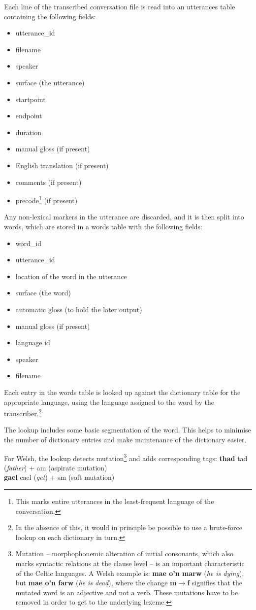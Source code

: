 \documentclass[11pt]{article}
\begin{document}
Each line of the transcribed conversation file is read into an utterances table containing the following fields:
\begin{itemize}
\setlength{\itemsep}{-2mm}
\item utterance\_id
\item filename
\item speaker
\item surface (the utterance)
\item startpoint
\item endpoint
\item duration
\item manual gloss (if present)
\item English translation (if present)
\item comments (if present)
\item precode\footnote{This marks entire utterances in the least-frequent language of the conversation.} (if present)
\end{itemize}

Any non-lexical markers in the utterance are discarded, and it is then split into words, which are stored in a words table with the following fields:
\begin{itemize}
\setlength{\itemsep}{-2mm}
\item word\_id
\item utterance\_id
\item location of the word in the utterance
\item surface (the word)
\item automatic gloss (to hold the later output)
\item manual gloss (if present)
\item language id
\item speaker
\item filename
\end{itemize}

Each entry in the words table is looked up against the dictionary table for the appropriate language, using the language assigned to the word by the transcriber.\footnote{In the absence of this, it would in principle be possible to use a brute-force lookup on each dictionary in turn.}

The lookup includes some basic segmentation of the word.  This helps to minimise the number of dictionary entries and make maintenance of the dictionary easier.

For Welsh, the lookup detects mutation\footnote{Mutation -- morphophonemic alteration of initial consonants, which also marks syntactic relations at the clause level -- is an important characteristic of the Celtic languages. A Welsh example is: \textbf{mae o'n marw} (\textit{he is dying}), but \textbf{mae o'n farw} (\textit{he is dead}), where the change \textbf{m$\rightarrow$f} signifies that the mutated word is an adjective and not a verb. These mutations have to be removed in order to get to the underlying lexeme.} and adds corresponding tags:
\textbf{thad} \textrightarrow tad (\textit{father}) + am (aspirate mutation) \\
\textbf{gael} \textrightarrow cael (\textit{get}) + sm (soft mutation)
\end{document}
